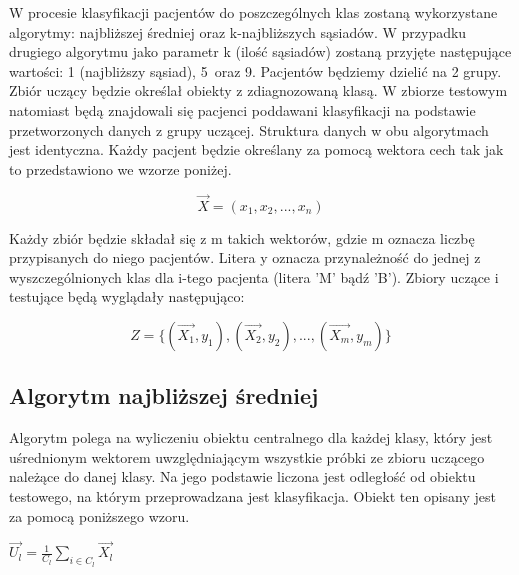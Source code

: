 \documentclass[12pt]{article}
\begin{document}
\indent W procesie klasyfikacji pacjentów do poszczególnych klas zostaną wykorzystane algorytmy: najbliższej średniej oraz k-najbliższych sąsiadów. W przypadku drugiego algorytmu jako parametr k (ilość sąsiadów) zostaną przyjęte następujące wartości: 1 (najbliższy sąsiad), 5~oraz 9. Pacjentów będziemy dzielić na 2 grupy. Zbiór uczący będzie określał obiekty z zdiagnozowaną klasą. W zbiorze testowym natomiast będą znajdowali się pacjenci poddawani klasyfikacji na podstawie przetworzonych danych z grupy uczącej. Struktura danych w obu algorytmach jest identyczna. Każdy pacjent będzie określany za pomocą wektora cech tak jak to przedstawiono we wzorze poniżej.
\begin{center}
\[ \vec{X} = (x_1, x_2, ... , x_n)\]
\end{center}


Każdy zbiór będzie składał się z m takich wektorów, gdzie m oznacza liczbę przypisanych do niego pacjentów. Litera y oznacza przynależność do jednej z wyszczególnionych klas dla i-tego pacjenta (litera 'M' bądź 'B').
Zbiory uczące i testujące będą wyglądały następująco:
\begin{center}
\[ Z=\{(\vec{X_{1}}, y_{1}), (\vec{X_{2}}, y_{2}), ... , (\vec{X_{m}}, y_{m})\}\]
\end{center}

\subsection{Algorytm najbliższej średniej}
\indent Algorytm polega na wyliczeniu obiektu centralnego dla każdej klasy, który jest uśrednionym wektorem uwzględniającym wszystkie próbki ze zbioru uczącego należące do danej klasy. Na jego podstawie liczona jest odległość od obiektu testowego, na którym przeprowadzana jest klasyfikacja. Obiekt ten opisany jest za pomocą poniższego wzoru.
\begin{center}
$ \vec{U_{l}}=\frac{1}{C_{l}}\sum_{i\in{C_{l}}}\vec{X_{l}} $ \cite{bib1}
\end{center}
\end{document}
